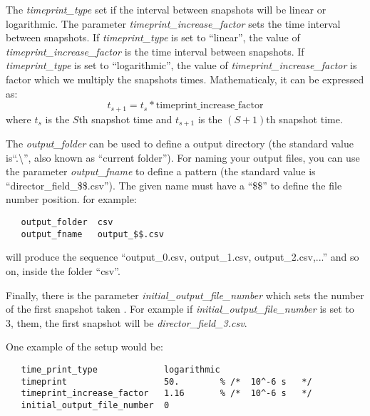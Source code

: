 \documentclass{article}
\begin{document}
The \textit{timeprint_type} 
{set if the interval between snapshots will be linear or logarithmic.
The parameter \textit{timeprint_increase_factor} sets the time interval between snapshots.
If \textit{timeprint_type} is set to ``linear'', the value of \textit{timeprint_increase_factor} is the time interval between snapshots. If \textit{timeprint_type} is set to ``logarithmic'', the value of \textit{timeprint_increase_factor} is factor which we multiply the snapshots times. Mathematicaly, it can be expressed as:}
\begin{equation}
  t_{s+1}=t_s *\textrm{timeprint_increase_factor}
\end{equation}
where $t_s$ is the $S$th snapshot time and $t_{s+1}$ is the $(S+1)$th snapshot time.

The \textit{output\_folder} can be used to define a output directory (the standard value is``.\textbackslash'', also known as ``current folder'').
For naming your output files, you can use the parameter \textit{output\_fname} to define a pattern (the standard value is ``director\_field\_\$\$.csv'').
The given name must have a ``\$\$'' to define the file number position.
for example:
\begin{lstlisting}
   output_folder  csv
   output_fname   output_$$.csv
\end{lstlisting}
will produce the sequence ``output\_0.csv, output\_1.csv, output\_2.csv,...'' and so on, inside the folder ``csv''.  

Finally, there is the parameter \textit{initial_output_file_number} which sets the number of the first snapshot taken . For example if \textit{initial_output_file_number} is set to 3, them, the first snapshot will be \textit{director_field_3.csv}.

One example of the setup would be:
\begin{lstlisting}
   time_print_type             logarithmic
   timeprint                   50.        % /*  10^-6 s   */
   timeprint_increase_factor   1.16       % /*  10^-6 s   */     
   initial_output_file_number  0	
\end{lstlisting}
\end{document}
